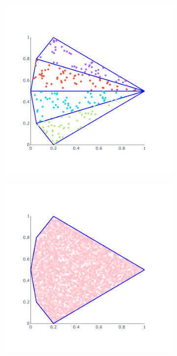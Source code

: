 \begin{figure}[h]
\begin{subfigure}{.45\textwidth}
		\caption{}
		\label{fig:sampling_2}
	\end{subfigure}
\vspace{-10pt}
	\begin{subfigure}{.45\textwidth}
	\centering
	\includegraphics[width=1.\textwidth]{./Images/sampling_3}
	\caption{}
	\label{fig:sampling_3}
	\end{subfigure}%
	\begin{subfigure}{.45\textwidth}
		\centering
		\includegraphics[width=1.\textwidth]{./Images/sampling_4}

\end{subfigure}
\end{figure}
